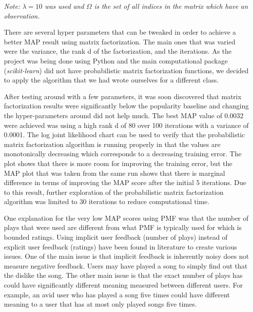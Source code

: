 \documentclass[12pt,preprint]{aastex}
\begin{document}
\emph{Note: $\lambda = 10$ was used and $\Omega$ is the set of all indices in the matrix which have an observation.}

There are several hyper parameters that can be tweaked in order to achieve a better MAP result using matrix factorization. The main ones that  was varied were the variance, the rank d of the factorization, and the iterations. As the project was being done using Python and the main computational package (\emph{scikit-learn}) did not have probabilistic matrix factorization functions, we decided to apply the algorithm that we had wrote ourselves for a different class. 
 
After testing around with a few parameters, it was soon discovered that matrix factorization results were significantly below the popularity baseline and changing the hyper-parameters around did not help much. The best MAP value of 0.0032 were achieved was using a high rank d of 80 over 100 iterations with a variance of 0.0001. The log joint likelihood chart can be used to verify that the probabilistic matrix factorization algorithm is running properly in that the values are monotonically decreasing which corresponds to a decreasing training error. The plot shows that there is more room for improving the training error, but the MAP plot that was taken from the same run shows that there is marginal difference in terms of improving the MAP score after the initial 5 iterations. Due to this result, further exploration of the probabilistic matrix factorization algorithm was limited to 30 iterations to reduce computational time. 
 
One explanation for the very low MAP scores using PMF was that the number of plays that were used are different from what PMF is typically used for which is bounded ratings. Using implicit user feedback (number of plays) instead of explicit user feedback (ratings) have been found in literature to create various issues. One of the main issue is that implicit feedback is inherently noisy does not measure negative feedback. Users may have played a song to simply find out that the dislike the song. The other main issue is that the exact number of plays has could have significantly different meaning measured between different users. For example, an avid user who has played a song five times could have different meaning to a user that has at most only played songs five times.
 
\end{document}
